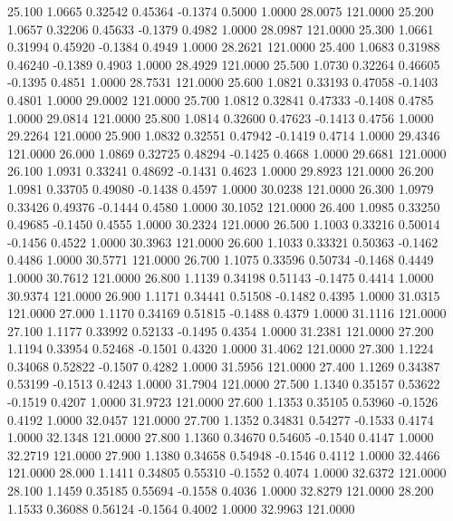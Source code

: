   25.100   1.0665   0.32542   0.45364  -0.1374   0.5000   1.0000  28.0075 121.0000
  25.200   1.0657   0.32206   0.45633  -0.1379   0.4982   1.0000  28.0987 121.0000
  25.300   1.0661   0.31994   0.45920  -0.1384   0.4949   1.0000  28.2621 121.0000
  25.400   1.0683   0.31988   0.46240  -0.1389   0.4903   1.0000  28.4929 121.0000
  25.500   1.0730   0.32264   0.46605  -0.1395   0.4851   1.0000  28.7531 121.0000
  25.600   1.0821   0.33193   0.47058  -0.1403   0.4801   1.0000  29.0002 121.0000
  25.700   1.0812   0.32841   0.47333  -0.1408   0.4785   1.0000  29.0814 121.0000
  25.800   1.0814   0.32600   0.47623  -0.1413   0.4756   1.0000  29.2264 121.0000
  25.900   1.0832   0.32551   0.47942  -0.1419   0.4714   1.0000  29.4346 121.0000
  26.000   1.0869   0.32725   0.48294  -0.1425   0.4668   1.0000  29.6681 121.0000
  26.100   1.0931   0.33241   0.48692  -0.1431   0.4623   1.0000  29.8923 121.0000
  26.200   1.0981   0.33705   0.49080  -0.1438   0.4597   1.0000  30.0238 121.0000
  26.300   1.0979   0.33426   0.49376  -0.1444   0.4580   1.0000  30.1052 121.0000
  26.400   1.0985   0.33250   0.49685  -0.1450   0.4555   1.0000  30.2324 121.0000
  26.500   1.1003   0.33216   0.50014  -0.1456   0.4522   1.0000  30.3963 121.0000
  26.600   1.1033   0.33321   0.50363  -0.1462   0.4486   1.0000  30.5771 121.0000
  26.700   1.1075   0.33596   0.50734  -0.1468   0.4449   1.0000  30.7612 121.0000
  26.800   1.1139   0.34198   0.51143  -0.1475   0.4414   1.0000  30.9374 121.0000
  26.900   1.1171   0.34441   0.51508  -0.1482   0.4395   1.0000  31.0315 121.0000
  27.000   1.1170   0.34169   0.51815  -0.1488   0.4379   1.0000  31.1116 121.0000
  27.100   1.1177   0.33992   0.52133  -0.1495   0.4354   1.0000  31.2381 121.0000
  27.200   1.1194   0.33954   0.52468  -0.1501   0.4320   1.0000  31.4062 121.0000
  27.300   1.1224   0.34068   0.52822  -0.1507   0.4282   1.0000  31.5956 121.0000
  27.400   1.1269   0.34387   0.53199  -0.1513   0.4243   1.0000  31.7904 121.0000
  27.500   1.1340   0.35157   0.53622  -0.1519   0.4207   1.0000  31.9723 121.0000
  27.600   1.1353   0.35105   0.53960  -0.1526   0.4192   1.0000  32.0457 121.0000
  27.700   1.1352   0.34831   0.54277  -0.1533   0.4174   1.0000  32.1348 121.0000
  27.800   1.1360   0.34670   0.54605  -0.1540   0.4147   1.0000  32.2719 121.0000
  27.900   1.1380   0.34658   0.54948  -0.1546   0.4112   1.0000  32.4466 121.0000
  28.000   1.1411   0.34805   0.55310  -0.1552   0.4074   1.0000  32.6372 121.0000
  28.100   1.1459   0.35185   0.55694  -0.1558   0.4036   1.0000  32.8279 121.0000
  28.200   1.1533   0.36088   0.56124  -0.1564   0.4002   1.0000  32.9963 121.0000
